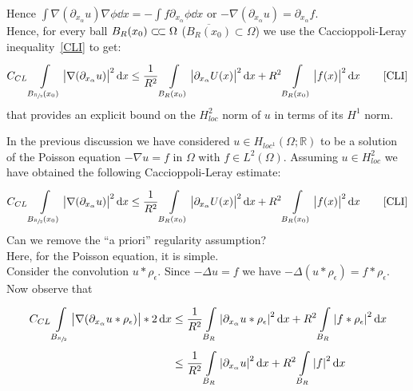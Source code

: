 Hence \( \int \nabla (\partial_{x_{\alpha }}u) \nabla \phi  \dd{x} = -\int f \partial_{x_{\alpha }}\phi  \dd{x} \) or \( -\nabla (\partial_{x_{\alpha }}u) = \partial_{x_{\alpha}}f \).\\
Hence, for every ball \( B_{R} (x_{0}) \ssubset \Omega  \) (\( \overline{B_{R} (x_{0})} \subset \Omega  \)) we use the Caccioppoli-Leray inequality~\eqref{CLI}  to get:
\begin{gather}
    C_{CL} \int\limits_{B_{\sfrac{R}{2}}(x_{0})}^{} \abs{\nabla (\partial_{x_{\alpha }}u) }^{2} \dd{x} \leq \frac{1}{R^{2}} \int\limits_{B_{R}(x_{0})}^{} \abs{\partial_{x_{\alpha }}U(x) }^{2} \dd{x} + R^{2} \int\limits_{B_{R}(x_{0})}^{} \abs{f(x) }^{2} \dd{x} \qquad \text{\eqref{CLI}}
\end{gather}
that provides an explicit bound on the \( H_{loc}^{2} \) norm of \( u \) in terms of its \( H^{1} \) norm.\\
\par
In the previous discussion we have considered \( u \in H_{loc^{1}}(\Omega ; \mathbb{R})  \) to be a solution of the Poisson equation \( -\nabla u = f \) in \( \Omega  \) with \( f \in L^{2}(\Omega ) \). Assuming \( u\in H_{loc}^{2} \) we have obtained the following Caccioppoli-Leray estimate:
\begin{gather}
    C_{CL} \int\limits_{B_{\sfrac{R}{2}}(x_{0})}^{} \abs{\nabla (\partial_{x_{\alpha }}u) }^{2} \dd{x} \leq \frac{1}{R^{2}} \int\limits_{B_{R}(x_{0})}^{} \abs{\partial_{x_{\alpha }}U(x) }^{2} \dd{x} + R^{2} \int\limits_{B_{R}(x_{0})}^{} \abs{f(x) }^{2} \dd{x} \qquad \text{\eqref{CLI}}
\end{gather}
Can we remove the \enquote{a priori} regularity assumption?\\
Here, for the Poisson equation, it is simple.\\
Consider the convolution \( u \ast \rho_{\epsilon } \). Since \( -\Delta  u = f \) we have \( -\Delta  (u \ast \rho_{\epsilon }) = f\ast \rho _{\epsilon }\).\\
Now observe that
\begin{align}
    C_{CL} \int\limits_{B_{\sfrac{R}{2}}}^{} \abs{\nabla (\partial_{x_{\alpha }}u\ast \rho _{\epsilon })}*2 \dd{x} & \leq \frac{1}{R^{2}}\int\limits_{B_{R}}^{} \abs{\partial_{x_{\alpha }}u \ast \rho _{\epsilon }}^{2} \dd{x} + R^{2}\int\limits_{B_{R}}^{} \abs{f\ast \rho _{\epsilon }}^{2} \dd{x} \\
                                                                                                                   & \leq  \frac{1}{R^{2}} \int\limits_{B_{R}}^{} \abs{\partial_{x_{\alpha }}u}^{2} \dd{x} + R^{2} \int\limits_{B_{R}}^{} \abs{f}^{2} \dd{x}
\end{align}
